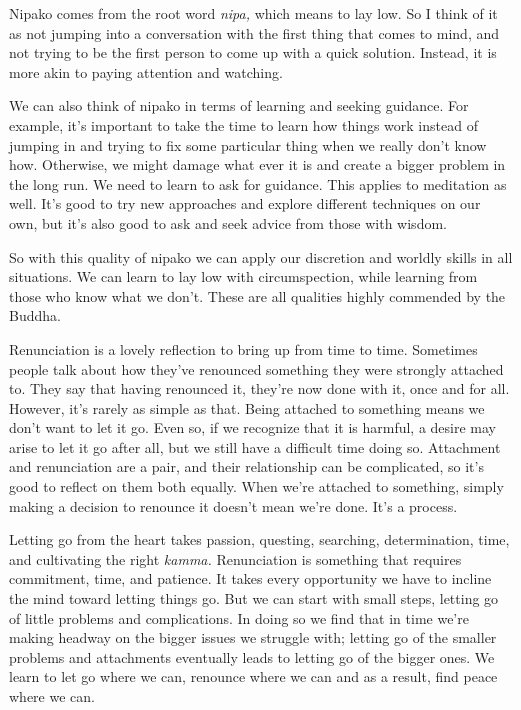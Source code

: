 Nipako comes from the root word \emph{nipa,} which means to lay low. So 
I think of it as not jumping into a conversation with the first thing 
that comes to mind, and not trying to be the first person to come up 
with a quick solution. Instead, it is more akin to paying attention and 
watching.

We can also think of nipako in terms of learning and seeking guidance. 
For example, it's important to take the time to learn how things work 
instead of jumping in and trying to fix some particular thing when we 
really don't know how. Otherwise, we might damage what ever it is and 
create a bigger problem in the long run. We need to learn to ask for 
guidance. This applies to meditation as well. It's good to try new 
approaches and explore different techniques on our own, but it's also 
good to ask and seek advice from those with wisdom.

So with this quality of nipako we can apply our discretion and worldly 
skills in all situations. We can learn to lay low with circumspection, 
while learning from those who know what we don't. These are all 
qualities highly commended by the Buddha.


Renunciation is a lovely reflection to bring up from time to time. 
Sometimes people talk about how they've renounced something they were 
strongly attached to. They say that having renounced it, they're now 
done with it, once and for all. However, it's rarely as simple as that. 
Being attached to something means we don't want to let it go. Even so, 
if we recognize that it is harmful, a desire may arise to let it go 
after all, but we still have a difficult time doing so. Attachment and 
renunciation are a pair, and their relationship can be complicated, so 
it's good to reflect on them both equally. When we're attached to 
something, simply making a decision to renounce it doesn't mean we're 
done. It's a process.

Letting go from the heart takes passion, questing, searching, 
determination, time, and cultivating the right \emph{kamma.} 
Renunciation is something that requires commitment, time, and patience. 
It takes every opportunity we have to incline the mind toward letting 
things go. But we can start with small steps, letting go of little 
problems and complications. In doing so we find that in time we're 
making headway on the bigger issues we struggle with; letting go of the 
smaller problems and attachments eventually leads to letting go of the 
bigger ones. We learn to let go where we can, renounce where we can and 
as a result, find peace where we can.

